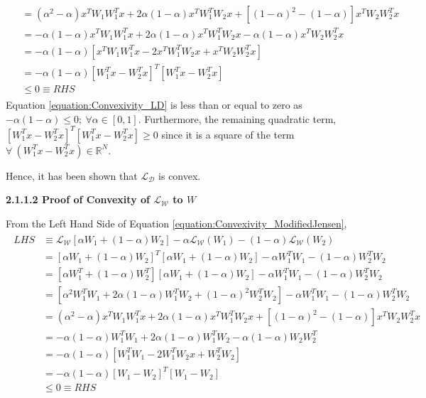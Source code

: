 \documentclass[a4paper,12pt]{article}
\begin{document}
\begin{align}
\begin{split}
	&= (\alpha^2 - \alpha) x^{T} W_1 W_1^{T} x + 2 \alpha (1 - \alpha) x^{T} W_1^{T} W_2 x
    	+ [(1 - \alpha)^2 - (1 - \alpha)] x^{T} W_2 W_2^{T} x \\
    &= - \alpha (1 - \alpha) x^{T} W_1 W_1^{T} x + 2 \alpha (1 - \alpha) x^{T} W_1^{T} W_2 x
    	- \alpha (1 - \alpha) x^{T} W_2 W_2^{T} x \\
    &= - \alpha (1 - \alpha) [ x^{T} W_1 W_1^{T} x - 2 x^{T} W_1^{T} W_2 x + 
        x^{T} W_2 W_2^{T} x ] \\
    \label{equation:Convexivity_LD} &= - \alpha (1 - \alpha) [W_1^{T} x - W_2^{T} x]^{T} [W_1^{T} x - W_2^{T} x] \\
    &\leq 0 \equiv RHS
\end{split}
\end{align}
Equation \ref{equation:Convexivity_LD} is less than or equal to zero as $-\alpha (1 - \alpha) \leq 0 ;\ \forall \alpha \in [0, 1]$. Furthermore, the remaining quadratic term, $[W_1^{T} x - W_2^{T} x]^{T} [W_1^{T} x - W_2^{T} x] \ge 0$ since it is a square of the term $\forall \ \left( W_1^{T} x - W_2^{T} x \right) \in \mathbb{R}^N$. 

Hence, it has been shown that $\mathcal{L_D}$ is convex.
\vspace{1em}

\clearpage
\textbf{2.1.1.2 Proof of Convexity of $\mathcal{L_W}$ to $W$}

From the Left Hand Side of Equation \ref{equation:Convexivity_ModifiedJensen},
\begin{align}
\begin{split}
	LHS &\equiv \mathcal{L_W}[\alpha W_1 + (1 - \alpha) W_2 ] - 
    	\alpha \mathcal{L_W}(W_1) - (1 - \alpha) \mathcal{L_W}(W_2) \\
    &= [\alpha W_1 + (1 - \alpha) W_2]^{T} [\alpha W_1 + (1 - \alpha) W_2] 
    	- \alpha W_1^{T} W_1 - (1 - \alpha) W_2^{T} W_2 \\
    &= [\alpha W_1^{T} + (1 - \alpha) W_2^{T}] [\alpha W_1 + (1 - \alpha) W_2] 
    	- \alpha W_1^{T} W_1 - (1 - \alpha) W_2^{T} W_2 \\
    &= [\alpha^2 W_1^{T} W_1 + 2 \alpha (1 - \alpha) W_1^{T} W_2 + (1 - \alpha)^2 W_2^{T} W_2]
    	- \alpha W_1^{T} W_1 - (1 - \alpha) W_2^{T} W_2 \\
    &= (\alpha^2 - \alpha) x^{T} W_1 W_1^{T} x + 2 \alpha (1 - \alpha) x^{T} W_1^{T} W_2 x
    	+ [(1 - \alpha)^2 - (1 - \alpha)] x^{T} W_2 W_2^{T} x \\
    &= - \alpha (1 - \alpha) W_1^{T} W_1 + 2 \alpha (1 - \alpha) W_1^{T} W_2
    	- \alpha (1 - \alpha) W_2 W_2^{T}\\
    &= - \alpha (1 - \alpha) [ W_1^{T} W_1 - 2 W_1^{T} W_2 x + W_2^{T} W_2] \\
    \label{equation:Convexivity_LW} &= - \alpha (1 - \alpha) [W_1 - W_2]^{T} [W_1 - W_2] \\
    &\leq 0 \equiv RHS
\end{split}
\end{align}
\end{document}
